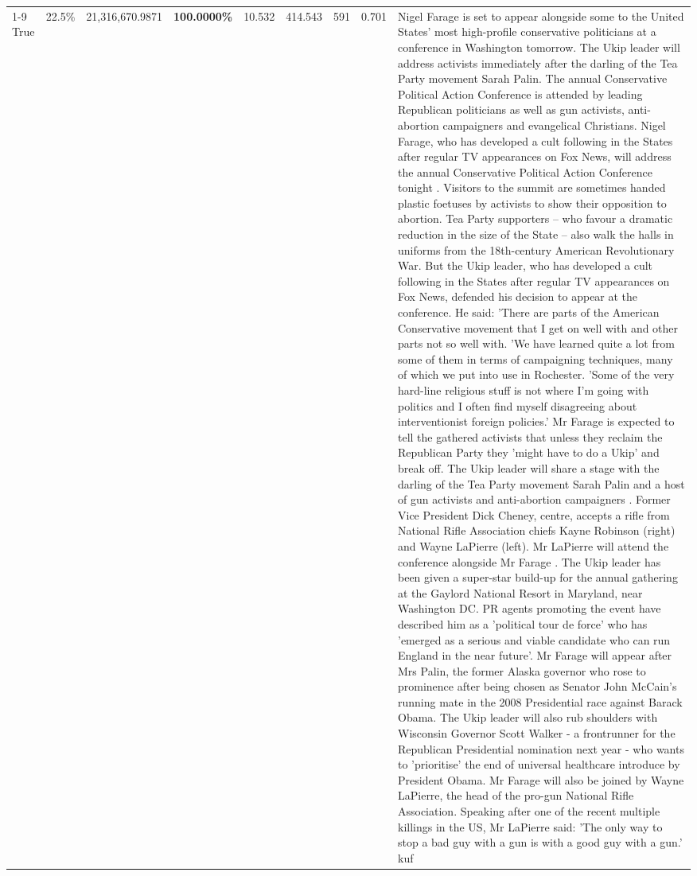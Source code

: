 \begin{table}[H]
\begin{tabular}{lllrlllll}
\cline{1-9}
True & 22.5\% & 21,316,670.9871 & \bfseries \color{red} 100.0000\% & 10.532 & 414.543 & 591 & 0.701 & Nigel Farage is set to appear alongside some to the United States' most high-profile conservative politicians at a conference in Washington tomorrow. The Ukip leader will address activists immediately after the darling of the Tea Party movement Sarah Palin. The annual Conservative Political Action Conference is attended by leading Republican politicians as well as gun activists, anti-abortion campaigners and evangelical Christians. Nigel Farage, who has developed a cult following in the States after regular TV appearances on Fox News, will address the annual Conservative Political Action Conference tonight . Visitors to the summit are sometimes handed plastic foetuses by activists to show their opposition to abortion. Tea Party supporters – who favour a dramatic reduction in the size of the State – also walk the halls in uniforms from the 18th-century American Revolutionary War. But the Ukip leader, who has developed a cult following in the States after regular TV appearances on Fox News, defended his decision to appear at the conference. He said: 'There are parts of the American Conservative movement that I get on well with and other parts not so well with. 'We have learned quite a lot from some of them in terms of campaigning techniques, many of which we put into use in Rochester. 'Some of the very hard-line religious stuff is not where I'm going with politics and I often find myself disagreeing about interventionist foreign policies.' Mr Farage is expected to tell the gathered activists that unless they reclaim the Republican Party they 'might have to do a Ukip' and break off. The Ukip leader will share a stage with the darling of the Tea Party movement Sarah Palin and a host of gun activists and anti-abortion campaigners . Former Vice President Dick Cheney, centre, accepts a rifle from National Rifle Association chiefs Kayne Robinson (right) and Wayne LaPierre (left). Mr LaPierre will attend the conference alongside Mr Farage . The Ukip leader has been given a super-star build-up for the annual gathering at the Gaylord National Resort in Maryland, near Washington DC. PR agents promoting the event have described him as a 'political tour de force' who has 'emerged as a serious and viable candidate who can run England in the near future'. Mr Farage will appear after Mrs Palin, the former Alaska governor who rose to prominence after being chosen as Senator John McCain's running mate in the 2008 Presidential race against Barack Obama. The Ukip leader will also rub shoulders with Wisconsin Governor Scott Walker - a frontrunner for the Republican Presidential nomination next year - who wants to 'prioritise' the end of universal healthcare introduce by President Obama. Mr Farage will also be joined by Wayne LaPierre, the head of the pro-gun National Rifle Association. Speaking after one of the recent multiple killings in the US, Mr LaPierre said: 'The only way to stop a bad guy with a gun is with a good guy with a gun.' kuf \\

\end{tabular}
\end{table}
